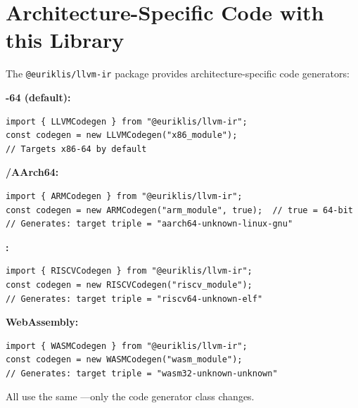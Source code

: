 \section{Architecture-Specific Code with this Library}

The \texttt{@euriklis/llvm-ir} package provides architecture-specific code generators:

\textbf{-64 (default):}
\begin{lstlisting}[style=ts]
import { LLVMCodegen } from "@euriklis/llvm-ir";
const codegen = new LLVMCodegen("x86_module");
// Targets x86-64 by default
\end{lstlisting}

\textbf{/AArch64:}
\begin{lstlisting}[style=ts]
import { ARMCodegen } from "@euriklis/llvm-ir";
const codegen = new ARMCodegen("arm_module", true);  // true = 64-bit
// Generates: target triple = "aarch64-unknown-linux-gnu"
\end{lstlisting}

\textbf{:}
\begin{lstlisting}[style=ts]
import { RISCVCodegen } from "@euriklis/llvm-ir";
const codegen = new RISCVCodegen("riscv_module");
// Generates: target triple = "riscv64-unknown-elf"
\end{lstlisting}

\textbf{WebAssembly:}
\begin{lstlisting}[style=ts]
import { WASMCodegen } from "@euriklis/llvm-ir";
const codegen = new WASMCodegen("wasm_module");
// Generates: target triple = "wasm32-unknown-unknown"
\end{lstlisting}

All use the same —only the code generator class changes.

